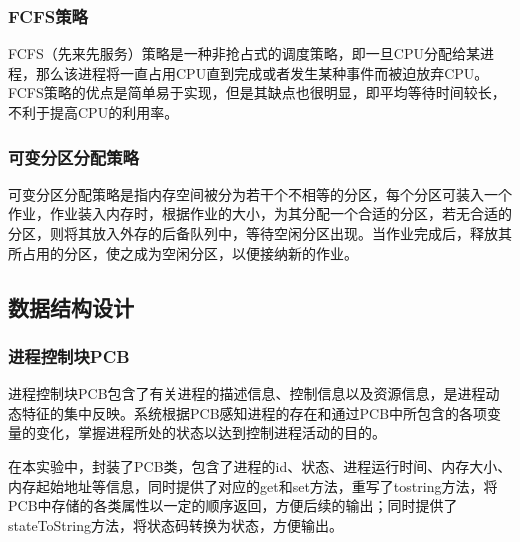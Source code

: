 \documentclass[UTF8,12pt]{article}
\begin{document}
\subsubsection{FCFS策略}
FCFS（先来先服务）策略是一种非抢占式的调度策略，即一旦CPU分配给某进程，那么该进程将一直占用CPU直到完成或者发生某种事件而被迫放弃CPU。FCFS策略的优点是简单易于实现，但是其缺点也很明显，即平均等待时间较长，不利于提高CPU的利用率。


\subsubsection{可变分区分配策略}
可变分区分配策略是指内存空间被分为若干个不相等的分区，每个分区可装入一个作业，作业装入内存时，根据作业的大小，为其分配一个合适的分区，若无合适的分区，则将其放入外存的后备队列中，等待空闲分区出现。当作业完成后，释放其所占用的分区，使之成为空闲分区，以便接纳新的作业。

\subsection{数据结构设计}
\subsubsection{进程控制块PCB}
进程控制块PCB包含了有关进程的描述信息、控制信息以及资源信息，是进程动态特征的集中反映。系统根据PCB感知进程的存在和通过PCB中所包含的各项变量的变化，掌握进程所处的状态以达到控制进程活动的目的。

在本实验中，封装了PCB类，包含了进程的id、状态、进程运行时间、内存大小、内存起始地址等信息，同时提供了对应的get和set方法，重写了tostring方法，将PCB中存储的各类属性以一定的顺序返回，方便后续的输出；同时提供了stateToString方法，将状态码转换为状态，方便输出。
\end{document}
